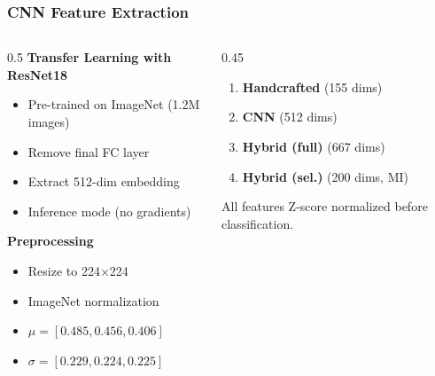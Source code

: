 \documentclass[aspectratio=169,professionalfonts]{beamer}
\begin{document}
\begin{frame}
    \frametitle{CNN Feature Extraction}
    \footnotesize
    
    \begin{columns}[T]
        \begin{column}{0.5\textwidth}
            \textbf{Transfer Learning with ResNet18}
            \vspace{0.2em}
            \begin{itemize}
                \footnotesize
                \setlength{\itemsep}{2pt}
                \item Pre-trained on ImageNet (1.2M images)
                \item Remove final FC layer
                \item Extract 512-dim embedding
                \item Inference mode (no gradients)
            \end{itemize}
            \vspace{0.3em}
            \textbf{Preprocessing}
            \begin{itemize}
                \footnotesize
                \setlength{\itemsep}{2pt}
                \item Resize to 224$\times$224
                \item ImageNet normalization
                \item $\mu = [0.485, 0.456, 0.406]$
                \item $\sigma = [0.229, 0.224, 0.225]$
            \end{itemize}
        \end{column}
        
        \begin{column}{0.45\textwidth}
            \begin{tcolorbox}[colback=ugmLightGrey,colframe=ugmBlue,title={\footnotesize Feature Representations}]
                \footnotesize
                \begin{enumerate}
                    \setlength{\itemsep}{1pt}
                    \item \textbf{Handcrafted} (155 dims)
                    \item \textbf{CNN} (512 dims)
                    \item \textbf{Hybrid (full)} (667 dims)
                    \item \textbf{Hybrid (sel.)} (200 dims, MI)
                \end{enumerate}
            \end{tcolorbox}
            \vspace{0.2em}
            \footnotesize
            All features Z-score normalized before classification.
        \end{column}
    \end{columns}
\end{frame}
\end{document}
